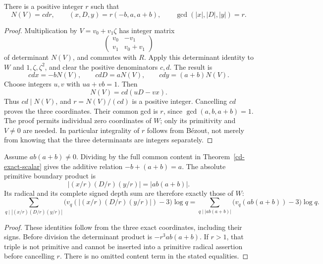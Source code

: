 \begin{theorem}
\label{cd-exact-scalar}
There is a positive integer \(r\) such that
\[
 N(V)=cdr,\qquad (x,D,y)=r(-b,a,a+b),
 \qquad \gcd(|x|,|D|,|y|)=r.
\]
\end{theorem}
\begin{proof}
Multiplication by \(V=v_0+v_1\zeta\) has integer matrix
\[
 \begin{pmatrix}v_0&-v_1\\v_1&v_0+v_1\end{pmatrix}
\]
of determinant \(N(V)\), and commutes with \(R\). Apply this determinant
identity to \(W\) and \(1,\zeta,\zeta^2\), and clear the positive
denominators \(c,d\). The result is
\[
 cdx=-bN(V),\qquad cdD=aN(V),\qquad cdy=(a+b)N(V).
\]
Choose integers \(u,v\) with \(ua+vb=1\). Then
\[
 N(V)=cd(uD-vx).
\]
Thus \(cd\mid N(V)\), and \(r=N(V)/(cd)\) is a positive integer.
Cancelling \(cd\) proves the three coordinates. Their common gcd is
\(r\), since \(\gcd(a,b,a+b)=1\). The proof permits individual zero
coordinates of \(W\); only its primitivity and \(V\ne0\) are needed.
In particular integrality of \(r\) follows from B\'ezout, not merely
from knowing that the three determinants are integers separately.
\end{proof}

\begin{corollary}
\label{cd-ledger}
Assume \(ab(a+b)\ne0\). Dividing by the full common content in
Theorem~\ref{cd-exact-scalar} gives the additive relation
\(-b+(a+b)=a\). The absolute primitive boundary product is
\[
 |(x/r)(D/r)(y/r)|=|ab(a+b)|.
\]
Its radical and its complete signed depth sum are therefore exactly
those of \(W\):
\[
 \sum_{q\mid |(x/r)(D/r)(y/r)|}
       \bigl(v_q(|(x/r)(D/r)(y/r)|)-3\bigr)\log q
 =\sum_{q\mid |ab(a+b)|}\bigl(v_q(ab(a+b))-3\bigr)\log q.
\]
\end{corollary}
\begin{proof}
These identities follow from the three exact coordinates, including
their signs. Before division the determinant product is
\(-r^3ab(a+b)\). If \(r>1\), that triple is not primitive and cannot
be inserted into a primitive radical assertion before cancelling \(r\).
There is no omitted content term in the stated equalities.
\end{proof}

